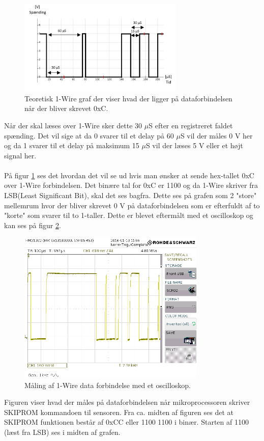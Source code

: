 \begin{figure}[h!]
  \centering
  \includegraphics[width=0.7\textwidth]{figures/onewire.png}
  \caption{Teoretisk 1-Wire graf der viser hvad der ligger på dataforbindelsen når der bliver skrevet 0xC.}
  \label{onewire_graph}
\end{figure}
Når der skal læses over 1-Wire sker dette 30 $\mu$S efter en registreret faldet spænding. Det vil sige at da 0 svarer til et delay på 60 $\mu$S vil der måles 0 V her og da 1 svarer til et delay på maksimum 15 $\mu$S vil der læses 5 V eller et højt signal her.
\\
\\
På figur \ref{onewire_graph} ses det hvordan det vil se ud hvis man ønsker at sende hex-tallet 0xC over 1-Wire forbindelsen. Det binære tal for 0xC er 1100 og da 1-Wire skriver fra LSB(Least Significant Bit), skal det ses bagfra. Dette ses på grafen som 2 "store" mellemrum hvor der bliver skrevet 0 V på dataforbindelsen som er efterfuldt af to "korte" som svarer til to 1-taller. \newline Dette er blevet eftermålt med et oscilloskop og kan ses på figur \ref{SCR02}.


\begin{figure}[h!]
  \centering
  \includegraphics[width=0.8\textwidth]{figures/SCR02.png}
  \caption{Måling af 1-Wire data forbindelse med et oscilloskop.}
  \label{SCR02}
\end{figure}

Figuren viser hvad der måles på dataforbindelsen når mikroprocessoren skriver SKIPROM kommandoen til sensoren.
Fra ca. midten af figuren ses det at SKIPROM funktionen består af 0xCC eller 1100 1100 i binær. Starten af 1100 (læst fra LSB) ses i midten af grafen.